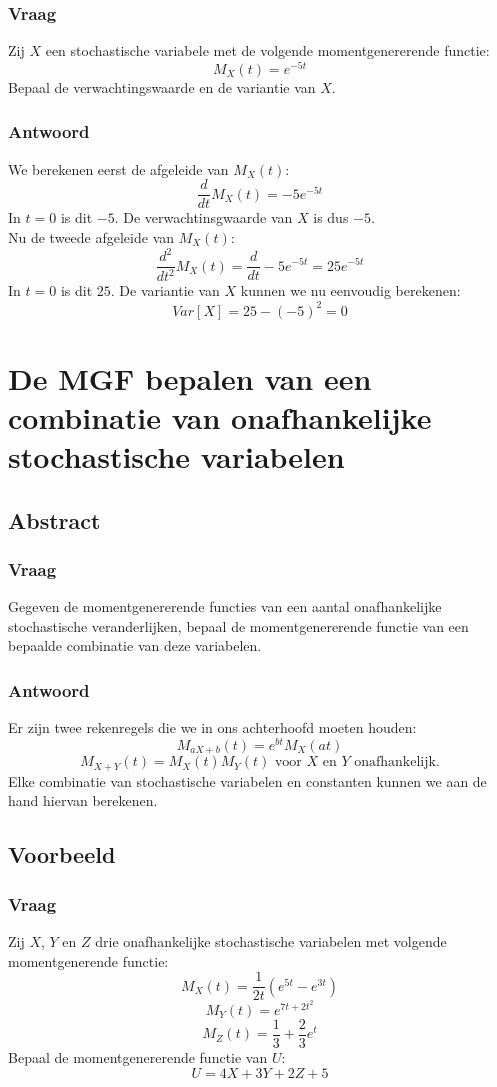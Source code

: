 \documentclass[main.tex]{subfiles}
\begin{document}
\subsubsection*{Vraag}
Zij $X$ een stochastische variabele met de volgende momentgenererende functie:
\[ M_{X}(t) = e^{-5t} \]
Bepaal de verwachtingswaarde en de variantie van $X$.

\subsubsection*{Antwoord}
We berekenen eerst de afgeleide van $M_{X}(t)$:
\[ \frac{d}{dt}M_{X}(t) = -5e^{-5t} \]
In $t=0$ is dit $-5$.
De verwachtinsgwaarde van $X$ is dus $-5$.\\
Nu de tweede afgeleide van $M_{X}(t)$:
\[ \frac{d^{2}}{dt^{2}}M_{X}(t) = \frac{d}{dt} -5e^{-5t} = 25e^{-5t} \]
In $t=0$ is dit $25$.
De variantie van $X$ kunnen we nu eenvoudig berekenen:
\[ Var[X] = 25 - (-5)^{2} = 0 \]


\newpage
\section{De MGF bepalen van een combinatie van onafhankelijke stochastische variabelen}
\subsection*{Abstract}
\subsubsection*{Vraag}
Gegeven de momentgenererende functies van een aantal onafhankelijke stochastische veranderlijken, bepaal de momentgenererende functie van een bepaalde combinatie van deze variabelen.
\subsubsection*{Antwoord}
Er zijn twee rekenregels die we in ons achterhoofd moeten houden:
\[ M_{aX+b}(t) = e^{bt}M_{X}(at) \]
\[ M_{X+Y}(t) = M_{X}(t)M_{Y}(t) \text{ voor $X$ en $Y$ onafhankelijk.} \]
Elke combinatie van stochastische variabelen en constanten kunnen we aan de hand hiervan berekenen.

\subsection*{Voorbeeld}
\subsubsection*{Vraag}
Zij $X$, $Y$ en $Z$ drie onafhankelijke stochastische variabelen met volgende momentgenerende functie:
\[ M_{X}(t) = \frac{1}{2t}(e^{5t}-e^{3t}) \]
\[ M_{Y}(t) = e^{7t + 2t^{2}}\]
\[ M_{Z}(t) = \frac{1}{3} + \frac{2}{3}e^{t} \]
Bepaal de momentgenererende functie van $U$:
\[ U = 4X + 3Y + 2Z + 5  \]
\end{document}
